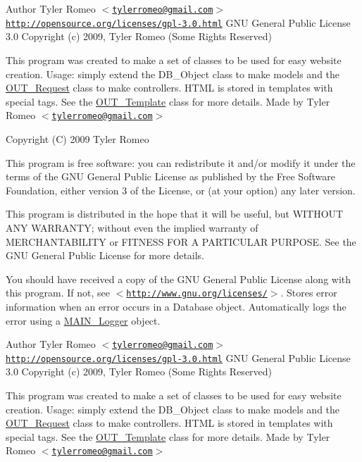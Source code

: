 \begin{DoxyAuthor}{Author}
Tyler Romeo $<$\href{mailto:tylerromeo@gmail.com}{\tt tylerromeo@gmail.com}$>$  \href{http://opensource.org/licenses/gpl-3.0.html}{\tt http://opensource.org/licenses/gpl-\/3.0.html} GNU General Public License 3.0  Copyright (c) 2009, Tyler Romeo (Some Rights Reserved)
\end{DoxyAuthor}
This program was created to make a set of classes to be used for easy website creation. Usage: simply extend the DB\_\-Object class to make models and the \hyperlink{classOUT__Request}{OUT\_\-Request} class to make controllers. HTML is stored in templates with special tags. See the \hyperlink{classOUT__Template}{OUT\_\-Template} class for more details. Made by Tyler Romeo $<$\href{mailto:tylerromeo@gmail.com}{\tt tylerromeo@gmail.com}$>$

Copyright (C) 2009 Tyler Romeo

This program is free software: you can redistribute it and/or modify it under the terms of the GNU General Public License as published by the Free Software Foundation, either version 3 of the License, or (at your option) any later version.

This program is distributed in the hope that it will be useful, but WITHOUT ANY WARRANTY; without even the implied warranty of MERCHANTABILITY or FITNESS FOR A PARTICULAR PURPOSE. See the GNU General Public License for more details.

You should have received a copy of the GNU General Public License along with this program. If not, see $<$\href{http://www.gnu.org/licenses/}{\tt http://www.gnu.org/licenses/}$>$. Stores error information when an error occurs in a Database object. Automatically logs the error using a \hyperlink{classMAIN__Logger}{MAIN\_\-Logger} object.

\begin{DoxyAuthor}{Author}
Tyler Romeo $<$\href{mailto:tylerromeo@gmail.com}{\tt tylerromeo@gmail.com}$>$  \href{http://opensource.org/licenses/gpl-3.0.html}{\tt http://opensource.org/licenses/gpl-\/3.0.html} GNU General Public License 3.0  Copyright (c) 2009, Tyler Romeo (Some Rights Reserved)
\end{DoxyAuthor}
This program was created to make a set of classes to be used for easy website creation. Usage: simply extend the DB\_\-Object class to make models and the \hyperlink{classOUT__Request}{OUT\_\-Request} class to make controllers. HTML is stored in templates with special tags. See the \hyperlink{classOUT__Template}{OUT\_\-Template} class for more details. Made by Tyler Romeo $<$\href{mailto:tylerromeo@gmail.com}{\tt tylerromeo@gmail.com}$>$

